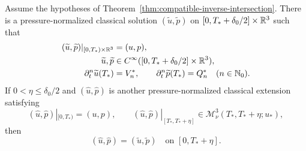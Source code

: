 \begin{theorem}
\label{thm:ier-same-history-restart}
Assume the hypotheses of
Theorem~\ref{thm:compatible-inverse-intersection}.
There is a pressure-normalized classical solution
\((\widetilde u,\widetilde p)\) on
\([0,T_*+\delta_0/2]\times\mathbb R^3\) such that
\begin{align}
 (\widetilde u,\widetilde p)|_{[0,T_*)\times\mathbb R^3}
 &=(u,p),
 \label{eq:ier-extension-identity}\\
 \widetilde u,\widetilde p
 &\in C^\infty([0,T_*+\delta_0/2]\times\mathbb R^3),
 \label{eq:ier-extension-smoothness}\\
 \partial_t^n\widetilde u(T_*)&=V_n^*,
 \qquad
 \partial_t^n\widetilde p(T_*)=Q_n^*
 \quad(n\in\mathbb N_0).
 \label{eq:ier-extension-jet}
\end{align}
If \(0<\eta\le\delta_0/2\) and
\((\widehat u,\widehat p)\) is another pressure-normalized classical
extension satisfying
\begin{equation}
 (\widehat u,\widehat p)|_{[0,T_*)}=(u,p),
 \qquad
 (\widehat u,\widehat p)|_{[T_*,T_*+\eta]}
 \in\mathscr M_\nu^3(T_*,T_*+\eta;u_*),
 \label{eq:ier-same-history-uniqueness-class}
\end{equation}
then
\begin{equation}
 (\widehat u,\widehat p)=(\widetilde u,\widetilde p)
 \quad\text{on }[0,T_*+\eta].
 \label{eq:ier-same-history-uniqueness}
\end{equation}
\end{theorem}


